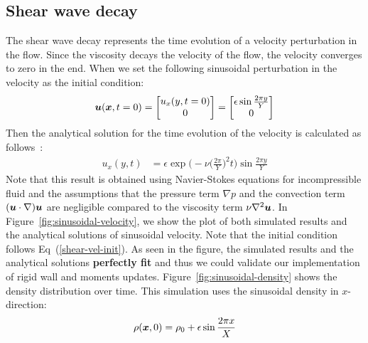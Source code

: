 \subsection{Shear wave decay}
The shear wave decay represents the time evolution of a
velocity perturbation in the flow.
Since the viscosity decays the velocity of the flow,
the velocity converges to zero in the end.
When we set the following sinusoidal perturbation in the velocity
as the initial condition:
\begin{equation}
  \begin{aligned}
    \boldsymbol{u}(\boldsymbol{x}, t = 0) =
    \begin{bmatrix}
      u_x(y, t = 0) \\
      0 \\
    \end{bmatrix}
    =  
    \begin{bmatrix}
      \epsilon \sin \frac{2\pi y}{Y} \\
        0 \\
      \end{bmatrix}
  \end{aligned}
  \label{shear-vel-init}
\end{equation}
Then the analytical solution for the time evolution of 
the velocity is calculated as follows~\cite{fei2018three}:
\begin{equation}
  \begin{aligned}
    u_x(y, t) &= 
    \epsilon \exp\biggl(
      -\nu \biggl(
        \frac{2\pi}{Y}
      \biggr)^2 t\biggr) \sin \frac{2\pi y}{Y}
  \end{aligned}
  \label{sinusoidal-vel-analytical-solution}
\end{equation}
Note that this result is obtained using Navier-Stokes equations for incompressible fluid
and the assumptions that the pressure term $\nabla p$ and
the convection term $(\boldsymbol{u} \cdot \nabla) \boldsymbol{u}$ are negligible 
compared to the viscosity term $\nu \nabla^2 \boldsymbol{u}$.
In Figure~\ref{fig:sinusoidal-velocity}, we show the plot of both
simulated results and the analytical solutions of sinusoidal velocity.
Note that the initial condition follows Eq~(\ref{shear-vel-init}). 
As seen in the figure, the simulated results and the analytical solutions
{\bf perfectly fit} and thus we could validate our implementation of
rigid wall and moments updates.
Figure~\ref{fig:sinusoidal-density} shows the density distribution
over time.
This simulation uses the sinusoidal density in $x$-direction:
\begin{equation}
\begin{aligned}
  \rho(\boldsymbol{x}, 0) = \rho_0 + \epsilon \sin \frac{2 \pi x}{X}
\end{aligned}
\end{equation}

